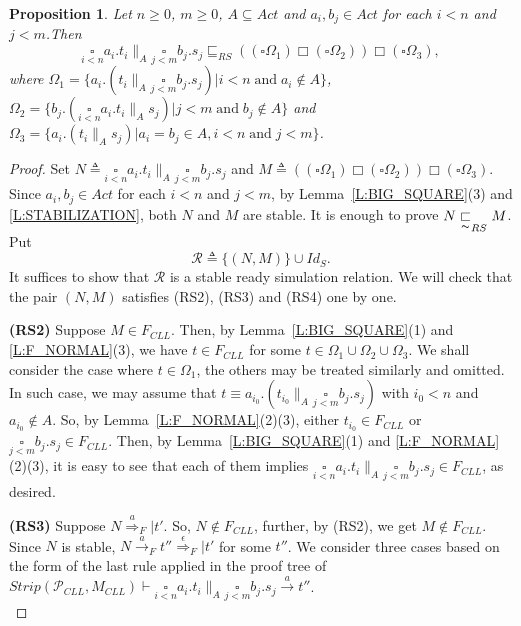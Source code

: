 \documentclass{elsarticle}
\theoremstyle{plain}
\newtheorem{proposition}[theorem]{Proposition}
\theoremstyle{definition}
\begin{document}
\begin{proposition}\label{L:MULTIPLE_I}
Let $n \geq 0$, $m \geq 0$, $A \subseteq Act$ and
$a_i,b_j\in Act$ for each $i<n$ and $j<m$.Then
\[\underset{i< n}{\square}a_i.t_i \parallel_A \underset{j< m}{\square}b_j.s_j
  \sqsubseteq_{RS} ((\square \Omega_1) \Box (\square \Omega_2)) \Box (\square \Omega_3),\]
where
$\Omega_1 = \{a_i.(t_i \parallel_A \underset{j< m}{\square}b_j.s_j)|i<n\;\text{and}\;a_i \notin A \}$,
$\Omega_2 =  \{b_j.(\underset{i< n}{\square}a_i.t_i \parallel_A s_j)|j<m\;\text{and}\;b_j \notin A\}$ and
$\Omega_3 =  \{a_i.(t_i \parallel_A s_j)|a_i = b_j \in A,i<n\;\text{and}\;j<m\}$.
\end{proposition}
\begin{proof}
  Set $N \triangleq \underset{i< n}{\square}a_i.t_i \parallel_A \underset{j< m}{\square}b_j.s_j$ and $M\triangleq  ((\square \Omega_1) \Box (\square \Omega_2)) \Box (\square \Omega_3)$.
  Since $a_i,b_j\in Act$ for each $i< n$ and $j< m$, by Lemma~\ref{L:BIG_SQUARE}(3) and \ref{L:STABILIZATION}, both $N$ and $M$ are stable.
  It is enough to prove $N\underset{\thicksim}{\sqsubset}_{RS} M$. Put
  \[{\mathcal R}\triangleq\{(N,M)\}\cup Id_S.\]
  It suffices to show that $\mathcal R$ is a stable ready simulation relation. We will check that the pair $(N, M)$ satisfies (RS2), (RS3) and (RS4) one by one.

  \textbf{(RS2)} Suppose $M\in F_{CLL}$.
  Then, by Lemma~\ref{L:BIG_SQUARE}(1) and \ref{L:F_NORMAL}(3), we have $t \in F_{CLL}$ for some $t \in \Omega_1 \cup \Omega_2 \cup \Omega_3$.
  We shall consider the case where $t \in \Omega_1$, the others may be treated similarly and omitted.
  In such case, we may assume that $t \equiv a_{i_0}.(t_{i_0} \parallel_A \underset{j< m}{\square}b_j.s_j)$ with $i_0<n$ and $a_{i_0}\notin A$.
So, by Lemma~\ref{L:F_NORMAL}(2)(3), either $t_{i_0} \in F_{CLL}$ or $\underset{j< m}{\square}b_j.s_j  \in F_{CLL}$.
  Then, by Lemma~\ref{L:BIG_SQUARE}(1) and \ref{L:F_NORMAL}(2)(3), it is easy to see that each of them implies   $\underset{i< n}{\square}a_i.t_i \parallel_A \underset{j< m}{\square}b_j.s_j \in F_{CLL}$, as desired.

  \textbf{(RS3)} Suppose $N \stackrel{a}{\Longrightarrow}_F|t'$.
  So, $N \notin F_{CLL}$, further, by (RS2), we get $ M \notin F_{CLL}$.
  Since $N$ is stable, $N \stackrel{a}{\longrightarrow}_F t'' \stackrel{\epsilon}{\Longrightarrow}_F|t'$ for some $t''$.
  We consider three cases based on the form of the last rule applied in the proof tree of  $Strip({\mathcal P}_{CLL},M_{CLL}) \vdash \underset{i< n}{\square}a_i.t_i \parallel_A \underset{j< m}{\square}b_j.s_j \stackrel{a}{\longrightarrow}t''$.\\


\end{proof}
\end{document}
